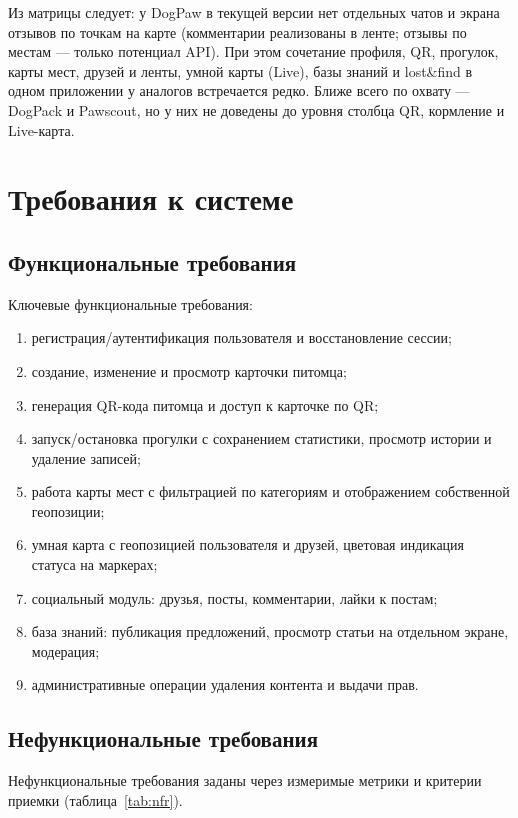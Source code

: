 \documentclass[12pt,a4paper]{article}
\begin{document}
Из матрицы следует: у DogPaw в текущей версии нет отдельных чатов и экрана отзывов по точкам на карте (комментарии реализованы в ленте; отзывы по местам --- только потенциал API). При этом сочетание профиля, QR, прогулок, карты мест, друзей и ленты, умной карты (Live), базы знаний и lost\&find в одном приложении у аналогов встречается редко. Ближе всего по охвату --- DogPack и Pawscout, но у них не доведены до уровня столбца QR, кормление и Live-карта.


\section{Требования к системе}

\subsection{Функциональные требования}

Ключевые функциональные требования:
\begin{enumerate}
  \item регистрация/аутентификация пользователя и восстановление сессии;
  \item создание, изменение и просмотр карточки питомца;
  \item генерация QR-кода питомца и доступ к карточке по QR;
  \item запуск/остановка прогулки с сохранением статистики, просмотр истории и удаление записей;
  \item работа карты мест с фильтрацией по категориям и отображением собственной геопозиции;
  \item умная карта с геопозицией пользователя и друзей, цветовая индикация статуса на маркерах;
  \item социальный модуль: друзья, посты, комментарии, лайки к постам;
  \item база знаний: публикация предложений, просмотр статьи на отдельном экране, модерация;
  \item административные операции удаления контента и выдачи прав.
\end{enumerate}

\subsection{Нефункциональные требования}

Нефункциональные требования заданы через измеримые метрики и критерии приемки (таблица~\ref{tab:nfr}).
\end{document}
